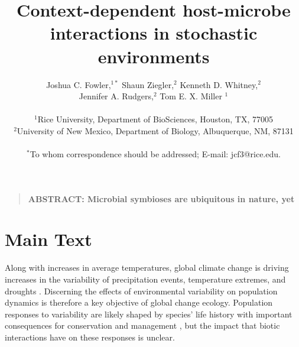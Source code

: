 \documentclass[12pt]{article}
\title{Context-dependent host-microbe interactions in stochastic environments}
\author
{Joshua C. Fowler,$^{1\ast}$ Shaun Ziegler,$^{2}$ Kenneth D. Whitney,$^{2}$\\
	 Jennifer A. Rudgers,$^{2}$ Tom E. X. Miller $^{1}$\\
\\
\normalsize{$^{1}$Rice University, Department of BioSciences, Houston, TX, 77005}\\
\normalsize{$^{2}$University of New Mexico, Department of Biology, Albuquerque, NM, 87131}\\
\\
\normalsize{$^\ast$To whom correspondence should be addressed; E-mail:  jcf3@rice.edu.}
}
\date{}
\newenvironment{sciabstract}{%
\begin{quote} \bf}
{\end{quote}}
\begin{document}
 


\baselineskip24pt


\maketitle 




\begin{sciabstract}
	ABSTRACT: Microbial symbioses are ubiquitous in nature, yet 


\end{sciabstract}




\section*{Main Text}

Along with increases in average temperatures, global climate change is driving increases in the variability of precipitation events, temperature extremes, and droughts \cite{IPCC2012managing, seneviratne2012changes, stocker2013technical}.
Discerning the effects of environmental variability on population dynamics is therefore a key objective of global change ecology. 
Population responses to variability are likely shaped by species' life history \cite{pfister1998patterns, morris2008longevity, saether2013life} with important consequences for conservation and management \cite{menges2000applications}, but the impact that biotic interactions have on these responses is unclear.
\end{document}
